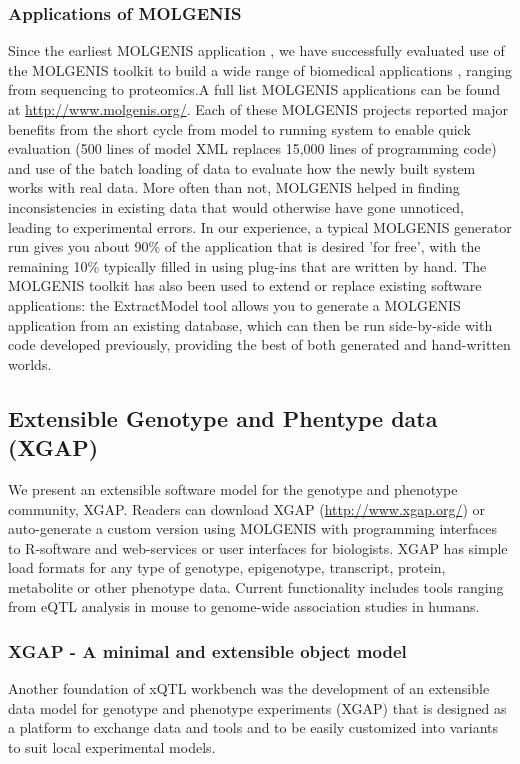 \subsubsection{Applications of MOLGENIS}
Since the earliest MOLGENIS application \cite{Swertz:2004}, we have successfully evaluated use of 
the MOLGENIS toolkit to build a wide range of biomedical applications \cite{Swertz:2010a, Fredman:2002, 
Leu:2010, Li:2009, Smedley:2008}, ranging from sequencing to proteomics.A full list MOLGENIS applications 
can be found at \url{http://www.molgenis.org/}. Each of these MOLGENIS projects reported major benefits 
from the short cycle from model to running system to enable quick evaluation (500 lines of model XML 
replaces 15,000 lines of programming code) and use of the batch loading of data to evaluate how the newly 
built system works with real data. More often than not, MOLGENIS helped in finding inconsistencies in 
existing data that would otherwise have gone unnoticed, leading to experimental errors. In our experience, 
a typical MOLGENIS generator run gives you about 90\% of the application that is desired 'for free', with the 
remaining 10\% typically filled in using plug-ins that are written by hand. The MOLGENIS toolkit has also 
been used to extend or replace existing software applications: the ExtractModel tool allows you to generate 
a MOLGENIS application from an existing database, which can then be run side-by-side with code developed 
previously, providing the best of both generated and hand-written worlds.

\subsection{Extensible Genotype and Phentype data (XGAP)}
We present an extensible software model for the genotype and phenotype community, XGAP. Readers 
can download XGAP (\url{http://www.xgap.org/}) or auto-generate a custom version using 
MOLGENIS with programming interfaces to R-software and web-services or user interfaces for 
biologists. XGAP has simple load formats for any type of genotype, epigenotype, transcript, 
protein, metabolite or other phenotype data. Current functionality includes tools ranging 
from eQTL analysis in mouse to genome-wide association studies in humans.

\subsubsection{XGAP - A minimal and extensible object model}
Another foundation of xQTL workbench was the development of an extensible data model for genotype 
and phenotype experiments (XGAP) that is designed as a platform to exchange data and tools and 
to be easily customized into variants to suit local experimental models.

